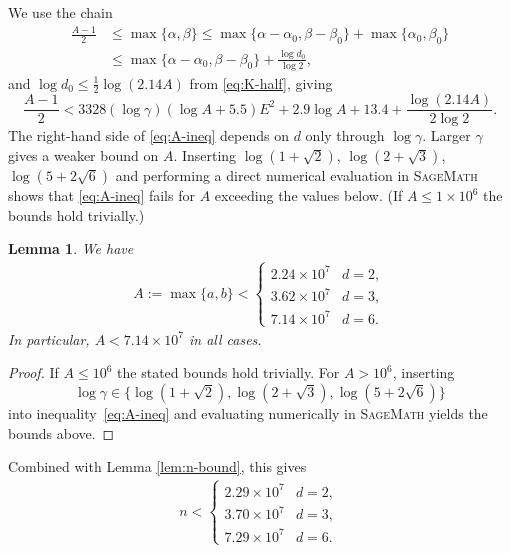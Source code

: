 \documentclass[11pt,a4paper]{article}
\newtheorem{lemma}[theorem]{Lemma}
\numberwithin{equation}{section}
\numberwithin{table}{section}
\numberwithin{figure}{section}
\begin{document}
We use the chain
\begin{align}\label{eq:chain}
	\frac{A-1}{2}
	&\leq \max\{\alpha,\beta\}
	\leq \max\{\alpha-\alpha_0,\beta-\beta_0\}+\max\{\alpha_0,\beta_0\}\nonumber\\
	&\leq \max\{\alpha-\alpha_0,\beta-\beta_0\}+\frac{\log d_0}{\log 2},
\end{align}
and $\log d_0 \leq \frac{1}{2}\log(2.14A)$ from \eqref{eq:K-half}, giving
\begin{equation}\label{eq:A-ineq}
	\frac{A-1}{2}
	< 3328(\log\gamma)(\log A+5.5)E^2+2.9\log A+13.4	+ \frac{\log(2.14A)}{2\log 2}.
\end{equation}
The right-hand side of \eqref{eq:A-ineq} depends on $d$ only through $\log\gamma$. Larger $\gamma$ gives a weaker bound on $A$. Inserting $\log(1+\sqrt{2})$, $\log(2+\sqrt{3})$,
$\log(5+2\sqrt{6})$ and performing a direct numerical evaluation in \textsc{SageMath} shows that \eqref{eq:A-ineq} fails for $A$ exceeding the values below. (If $A\leq 1\times 10^6$ the bounds hold trivially.)

\medskip

\begin{lemma}\label{lem:A-bound}
	We have
	\begin{align*}
		A := \max\{a,b\} <
		\begin{cases}
			 2.24\times 10^7 & d = 2, \\
			3.62\times 10^7 & d = 3, \\
			7.14\times 10^7 & d = 6.
		\end{cases}
	\end{align*}
	In particular, $A < 7.14\times 10^7$ in all cases.
\end{lemma}
\begin{proof}
	If $A \leq 10^6$ the stated bounds hold trivially. For $A > 10^6$,
	inserting 
	$$\log\gamma \in \{\log(1+\sqrt{2}), \log(2+\sqrt{3}),
	\log(5+2\sqrt{6})\}$$ into inequality~\eqref{eq:A-ineq} and evaluating
	numerically in \textsc{SageMath} yields the bounds above.
\end{proof}

Combined with Lemma \ref{lem:n-bound}, this gives
\begin{align*}
	n <
	\begin{cases}
		2.29\times 10^7 & d=2,\\
		3.70\times 10^7 & d=3,\\
		7.29\times 10^7 & d=6.
	\end{cases}
\end{align*}
\end{document}
